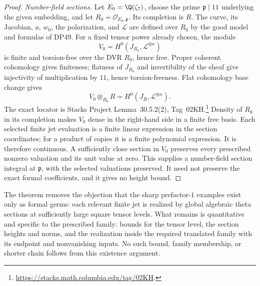 \begin{proof}
\emph{Number-field sections.}
Let $E_0=\Q(\zeta_7)$, choose the prime $\mathfrak p\mid11$ underlying the given embedding, and let $R_0=\mathcal O_{E_0,\mathfrak p}$. Its completion is $R$.
The curve, its Jacobian, $a$, $w_0$, the polarization, and $\mathcal L$ are defined over $R_0$ by the good model and formulas of DP49.
For a fixed tensor power already chosen, the module
\[
 V_0=H^0(J_{R_0},\mathcal L^{\otimes\kappa})
\]
is finite and torsion-free over the DVR $R_0$, hence free. Proper coherent cohomology gives finiteness; flatness of $J_{R_0}$ and invertibility of the sheaf give injectivity of multiplication by $11$, hence torsion-freeness.
Flat cohomology base change gives
\[
 V_0\otimes_{R_0}R
 =H^0(J_R,\mathcal L^{\otimes\kappa}).
\]
The exact locator is Stacks Project Lemma~30.5.2(2), Tag~02KH.\footnote{\url{https://stacks.math.columbia.edu/tag/02KH}.}
Density of $R_0$ in its completion makes $V_0$ dense in the right-hand side in a finite free basis. Each selected finite jet evaluation is a finite linear expression in the section coordinates; for a product of copies it is a finite polynomial expression. It is therefore continuous. A sufficiently close section in $V_0$ preserves every prescribed nonzero valuation and its unit value at zero.
This supplies a number-field section integral at $\mathfrak p$, with the selected valuations preserved. It need not preserve the exact formal coefficients, and it gives no height bound.
\end{proof}

The theorem removes the objection that the sharp prefactor-$1$ examples exist only as formal germs: each relevant finite jet is realized by global algebraic theta sections at sufficiently large square tensor levels. What remains is quantitative and specific to the prescribed family: bounds for the tensor level, the section heights and norms, and the realization inside the required translated family with its endpoint and nonvanishing inputs. No such bound, family membership, or shorter chain follows from this existence argument.
